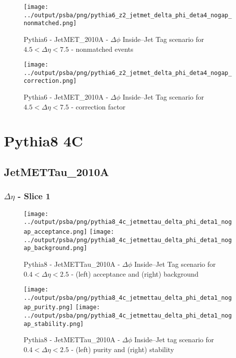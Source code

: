 \documentclass[11pt]{book}
\begin{document}
\begin{figure}[ht]
\centering
\texttt{[image: ../output/psba/png/pythia6\_z2\_jetmet\_delta\_phi\_deta4\_nogap\_nonmatched.png]}
\caption{Pythia6 - JetMET\_2010A - $\Delta\phi$ Inside--Jet Tag scenario for $4.5 < \Delta\eta < 7.5$ - nonmatched events}
\label{fig:p6_jetmet_delta_phi_deta4_nogap_nonmatched}
\end{figure}

\begin{figure}[ht]
\centering
\texttt{[image: ../output/psba/png/pythia6\_z2\_jetmet\_delta\_phi\_deta4\_nogap\_correction.png]}
\caption{Pythia6 - JetMET\_2010A - $\Delta\phi$ Inside--Jet Tag scenario for $4.5 < \Delta\eta < 7.5$ - correction factor}
\label{fig:p6_jetmet_delta_phi_deta4_nogap_correction}
\end{figure}


\clearpage
\section{Pythia8 4C}
\subsection{JetMETTau\_2010A}

\subsubsection{$\Delta\eta$ - Slice 1}

\begin{figure}[ht]
\centering
\texttt{[image: ../output/psba/png/pythia8\_4c\_jetmettau\_delta\_phi\_deta1\_nogap\_acceptance.png]}
\texttt{[image: ../output/psba/png/pythia8\_4c\_jetmettau\_delta\_phi\_deta1\_nogap\_background.png]}
\caption{Pythia8 - JetMETTau\_2010A - $\Delta\phi$ Inside--Jet Tag scenario for $0.4 < \Delta\eta < 2.5$ - (left) acceptance and (right) background}
\label{fig:p8_jetmettau_delta_phi_deta1_nogap_ab}
\end{figure}

\begin{figure}[ht]
\centering
\texttt{[image: ../output/psba/png/pythia8\_4c\_jetmettau\_delta\_phi\_deta1\_nogap\_purity.png]}
\texttt{[image: ../output/psba/png/pythia8\_4c\_jetmettau\_delta\_phi\_deta1\_nogap\_stability.png]}
\caption{Pythia8 - JetMETTau\_2010A - $\Delta\phi$ Inside--Jet tag scenario for $0.4 < \Delta\eta < 2.5$ - (left) purity and (right) stability}
\label{fig:p8_jetmettau_delta_phi_deta1_nogap_ps}
\end{figure}
\end{document}
